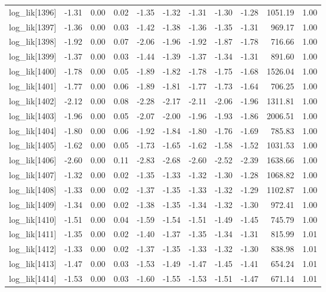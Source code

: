 \begin{table}[ht]
\begin{tabular}{rrrrrrrrrrr}
  log\_lik[1396] & -1.31 & 0.00 & 0.02 & -1.35 & -1.32 & -1.31 & -1.30 & -1.28 & 1051.19 & 1.00 \\ 
  log\_lik[1397] & -1.36 & 0.00 & 0.03 & -1.42 & -1.38 & -1.36 & -1.35 & -1.31 & 969.17 & 1.00 \\ 
  log\_lik[1398] & -1.92 & 0.00 & 0.07 & -2.06 & -1.96 & -1.92 & -1.87 & -1.78 & 716.66 & 1.00 \\ 
  log\_lik[1399] & -1.37 & 0.00 & 0.03 & -1.44 & -1.39 & -1.37 & -1.34 & -1.31 & 891.60 & 1.00 \\ 
  log\_lik[1400] & -1.78 & 0.00 & 0.05 & -1.89 & -1.82 & -1.78 & -1.75 & -1.68 & 1526.04 & 1.00 \\ 
  log\_lik[1401] & -1.77 & 0.00 & 0.06 & -1.89 & -1.81 & -1.77 & -1.73 & -1.64 & 706.25 & 1.00 \\ 
  log\_lik[1402] & -2.12 & 0.00 & 0.08 & -2.28 & -2.17 & -2.11 & -2.06 & -1.96 & 1311.81 & 1.00 \\ 
  log\_lik[1403] & -1.96 & 0.00 & 0.05 & -2.07 & -2.00 & -1.96 & -1.93 & -1.86 & 2006.51 & 1.00 \\ 
  log\_lik[1404] & -1.80 & 0.00 & 0.06 & -1.92 & -1.84 & -1.80 & -1.76 & -1.69 & 785.83 & 1.00 \\ 
  log\_lik[1405] & -1.62 & 0.00 & 0.05 & -1.73 & -1.65 & -1.62 & -1.58 & -1.52 & 1031.53 & 1.00 \\ 
  log\_lik[1406] & -2.60 & 0.00 & 0.11 & -2.83 & -2.68 & -2.60 & -2.52 & -2.39 & 1638.66 & 1.00 \\ 
  log\_lik[1407] & -1.32 & 0.00 & 0.02 & -1.35 & -1.33 & -1.32 & -1.30 & -1.28 & 1068.82 & 1.00 \\ 
  log\_lik[1408] & -1.33 & 0.00 & 0.02 & -1.37 & -1.35 & -1.33 & -1.32 & -1.29 & 1102.87 & 1.00 \\ 
  log\_lik[1409] & -1.34 & 0.00 & 0.02 & -1.38 & -1.35 & -1.34 & -1.32 & -1.30 & 972.41 & 1.00 \\ 
  log\_lik[1410] & -1.51 & 0.00 & 0.04 & -1.59 & -1.54 & -1.51 & -1.49 & -1.45 & 745.79 & 1.00 \\ 
  log\_lik[1411] & -1.35 & 0.00 & 0.02 & -1.40 & -1.37 & -1.35 & -1.34 & -1.31 & 815.99 & 1.01 \\ 
  log\_lik[1412] & -1.33 & 0.00 & 0.02 & -1.37 & -1.35 & -1.33 & -1.32 & -1.30 & 838.98 & 1.01 \\ 
  log\_lik[1413] & -1.47 & 0.00 & 0.03 & -1.53 & -1.49 & -1.47 & -1.45 & -1.41 & 654.24 & 1.01 \\ 
  log\_lik[1414] & -1.53 & 0.00 & 0.03 & -1.60 & -1.55 & -1.53 & -1.51 & -1.47 & 671.14 & 1.01 \\ 

\end{tabular}
\end{table}
